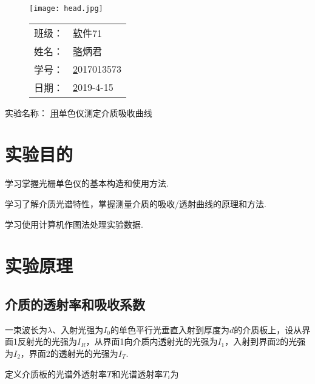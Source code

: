 \documentclass{thureport}
\newcommand{\major}{软件71}
\newcommand{\name}{骆炳君}
\newcommand{\stuid}{2017013573}
\newcommand{\newdate}{2019-4-15}
\newcommand{\newtitle}{用单色仪测定介质吸收曲线}
\begin{document}
\thispagestyle{empty}
\begin{figure}[h]
	\begin{minipage}{0.65\linewidth}
		\centerline{\texttt{[image: head.jpg]}}
	\end{minipage}
	\hfill
	\begin{minipage}{.3\linewidth}
		\raggedleft
		\begin{tabular*}{.8\linewidth}{ll}
			班级： & \underline\major   \\
			姓名： & \underline\name    \\
			学号： & \underline\stuid   \\
			日期： & \underline\newdate
		\end{tabular*}
	\end{minipage}
\end{figure}
 
\begin{table}[!htbp]
	\centering\large
	实验名称： \underline\newtitle
\end{table}

\tableofcontents
\newpage

\section{实验目的}
\begin{clause}
	\item 学习掌握光栅单色仪的基本构造和使用方法.
	\item 学习了解介质光谱特性，掌握测量介质的吸收/透射曲线的原理和方法.
	\item 学习使用计算机作图法处理实验数据.
\end{clause}

\section{实验原理}
\subsection{介质的透射率和吸收系数}
一束波长为$\lambda$、入射光强为$I_0$的单色平行光垂直入射到厚度为$d$的介质板上，设从界面1反射光的光强为$I_R$，从界面1向介质内透射光的光强为$I_1$，入射到界面2的光强为$I_2$，界面2的透射光的光强为$I_T$.

定义介质板的光谱外透射率$T$和光谱透射率$T_i$为
\end{document}
